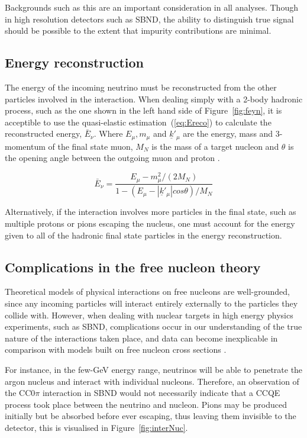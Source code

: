     Backgrounds such as this are an important consideration in all analyses. Though in high resolution detectors such as SBND, the ability to distinguish true signal should be possible to the extent that impurity contributions are minimal. 

\subsection{Energy reconstruction}

    The energy of the incoming neutrino must be reconstructed from the other particles involved in the interaction. When dealing simply with a 2-body hadronic process, such as the one shown in the left hand side of Figure~\ref{fig:feyn}, it is acceptible to use the quasi-elastic estimation~(\ref{eq:Ereco}) \cite{teppei} to calculate the reconstructed energy, $\bar{E}_{\nu}$. Where $E_{\mu}, m_{\mu}$ and $\underline{k}'_{\mu}$ are the energy, mass and 3-momentum of the final state
    muon, $M_{N}$ is the mass of a target nucleon and $\theta$ is the opening angle between the outgoing muon and proton \cite{teppei}.  


    \begin{equation}\label{eq:Ereco}
        \bar{E}_{\nu} = \frac{ E_{\mu} - m^{2}_{\mu} / (2M_{N}) }{ 1 - ( E_{\mu} - |\underline{k}'_{\mu}| cos \theta ) / M_{N} }
    \end{equation}

Alternatively, if the interaction involves more particles in the final state, such as multiple protons or pions escaping the nucleus, one must account for the energy given to all of the hadronic final state particles in the energy reconstruction. 

\subsection{Complications in the free nucleon theory}

Theoretical models of physical interactions on free nucleons are well-grounded, since any incoming particles will interact entirely externally to the particles they collide with. However, when dealing with nuclear targets in high energy physics experiments, such as SBND, complications occur in our understanding of the true nature of the interactions taken place, and data can become inexplicable in comparison with models built on free nucleon cross sections \cite{dipReg}. 

For instance, in the few-GeV energy range, neutrinos will be able to penetrate the argon nucleus and interact with individual nucleons. Therefore, an observation of the CC0\(\pi\) interaction in SBND would not necessarily indicate that a CCQE process took place between the neutrino and nucleon. Pions may be produced initially but be absorbed before ever escaping, thus leaving them invisible to the detector, this is visualised in Figure~\ref{fig:interNuc}.

